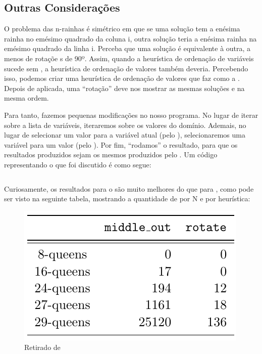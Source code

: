 \documentclass{article}
\begin{document}
\subsection{Outras Considerações}

O problema das n-rainhas é simétrico em que se uma solução tem a enésima rainha no emésimo quadrado da
coluna i, outra solução teria a enésima rainha na emésimo quadrado da linha i. Perceba que uma solução é
equivalente à outra, a menos de rotaçõe s de 90º. Assim, quando a heurística de ordenação de
variáveis  sucede sem , a heurística de ordenação de
valores  também deveria. Percebendo isso, podemos criar uma heurística
de ordenação de valores que faz  como a . Depois de
aplicada, uma ``rotação'' deve nos mostrar as mesmas soluções e na mesma ordem.

Para tanto, fazemos pequenas modificações no nosso programa. No lugar de iterar sobre a lista de
variáveis, iteraremos sobre os valores do domínio. Ademais, no lugar de selecionar um valor para a
variável atual (pelo ), selecionaremos uma variável para um valor (pelo
). Por fim, ``rodamos'' o resultado, para que os resultados produzidos sejam os
mesmos produzidos pelo . Um código representando o que foi discutido é como
segue:

\inputminted{prolog}{../Exemplos/Cap11/prog7_queensHeurRotate.ecl}

Curiosamente, os resultados para o  são muito melhores do que para
, como pode ser visto na seguinte tabela, mostrando a quantidade de
 por N e por heurística:

\begin{figure}[h]
  \caption{Retirado de \cite{krzysztof}}\label{fig:psi}
  \centering
  \includegraphics[scale=0.5]{rotate.png}
\end{figure}
\end{document}
